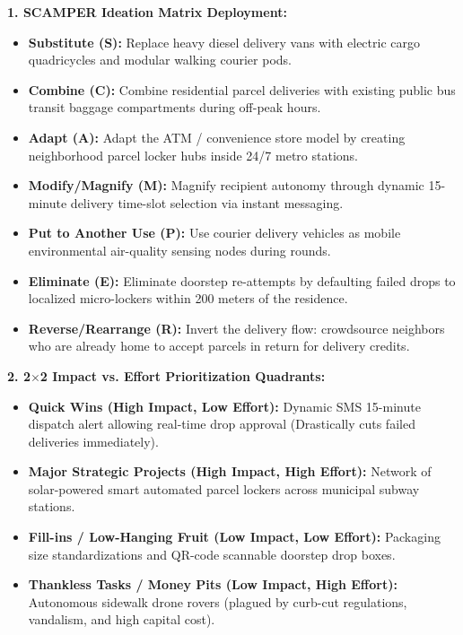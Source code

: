 \begin{solbox}
\textbf{1. SCAMPER Ideation Matrix Deployment:}\\
\begin{itemize}
    \item \textbf{Substitute (S):} Replace heavy diesel delivery vans with electric cargo quadricycles and modular walking courier pods.
    \item \textbf{Combine (C):} Combine residential parcel deliveries with existing public bus transit baggage compartments during off-peak hours.
    \item \textbf{Adapt (A):} Adapt the ATM / convenience store model by creating neighborhood parcel locker hubs inside 24/7 metro stations.
    \item \textbf{Modify/Magnify (M):} Magnify recipient autonomy through dynamic 15-minute delivery time-slot selection via instant messaging.
    \item \textbf{Put to Another Use (P):} Use courier delivery vehicles as mobile environmental air-quality sensing nodes during rounds.
    \item \textbf{Eliminate (E):} Eliminate doorstep re-attempts by defaulting failed drops to localized micro-lockers within 200 meters of the residence.
    \item \textbf{Reverse/Rearrange (R):} Invert the delivery flow: crowdsource neighbors who are already home to accept parcels in return for delivery credits.
\end{itemize}

\textbf{2. 2$\times$2 Impact vs. Effort Prioritization Quadrants:}\\
\begin{itemize}
    \item \textbf{Quick Wins (High Impact, Low Effort):} Dynamic SMS 15-minute dispatch alert allowing real-time drop approval (Drastically cuts failed deliveries immediately).
    \item \textbf{Major Strategic Projects (High Impact, High Effort):} Network of solar-powered smart automated parcel lockers across municipal subway stations.
    \item \textbf{Fill-ins / Low-Hanging Fruit (Low Impact, Low Effort):} Packaging size standardizations and QR-code scannable doorstep drop boxes.
    \item \textbf{Thankless Tasks / Money Pits (Low Impact, High Effort):} Autonomous sidewalk drone rovers (plagued by curb-cut regulations, vandalism, and high capital cost).
\end{itemize}


\end{solbox}

